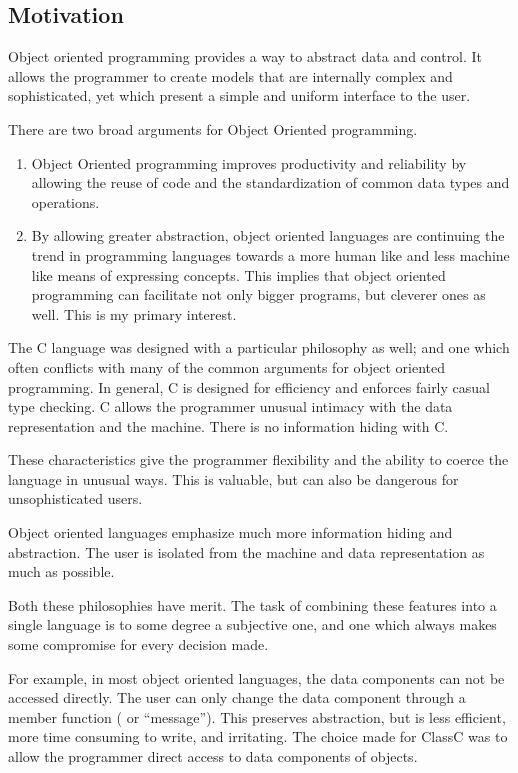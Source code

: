 \subsection{Motivation}
Object oriented programming provides a way to abstract data and
control.  It allows the programmer to create models that are internally
complex and sophisticated, yet which present a simple and uniform interface
to the user.

There are two broad arguments for Object Oriented
programming.

\begin{enumerate}
\item Object Oriented programming
improves productivity and reliability by allowing the reuse of code and the
standardization of common data types and operations.

\item By allowing greater abstraction, object
oriented languages are continuing the trend in programming languages
towards a more human like and less machine like means of expressing
concepts.  This implies that object oriented programming can facilitate
not only bigger programs, but cleverer ones as well.  This is my primary
interest.
\end{enumerate}

The C language was designed with a particular philosophy as well; and
one which often conflicts with many of the common arguments for object
oriented programming.  In general, C is designed for efficiency and
enforces fairly casual type checking.  C allows the programmer unusual
intimacy with the data representation and the machine.  There is no
information hiding with C.

These characteristics give the programmer flexibility and the ability to
coerce the language in unusual ways.  This is valuable, but can also be
dangerous for unsophisticated users.

Object oriented languages emphasize much more information hiding and
abstraction.  The user is isolated from the machine and data
representation as much as possible.

Both these philosophies have merit.  The task of combining these
features into a single language is to some degree a subjective one, and
one which always makes some compromise for every decision made.

For example, in most object oriented languages, the data components
can not be accessed directly.  The user can only change the data
component through a member function ( or ``message'').  This preserves
abstraction, but is less efficient, more time consuming to write,
and irritating.  The choice made for ClassC was to allow the programmer
direct access to data components of objects.

